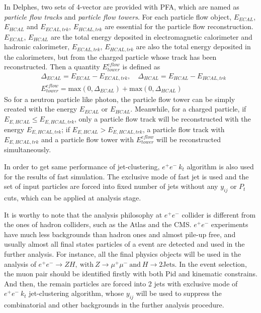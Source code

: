 \documentclass[a4paper,10pt,twoside]{cpc-hepnp}
\begin{document}
In Delphes, two sets of 4-vector are provided with PFA, which are named as {\it{particle flow tracks}} and {\it{particle flow towers}}. For each particle flow object, $E_{ECAL}$, $E_{HCAL}$ and $E_{ECAL, trk}$, $E_{HCAL, trk}$ are essential for the particle flow reconstruction. $E_{ECAL}$, $E_{HCAL}$ are the total energy deposited in electromagnetic calorimeter and hadronic calorimeter, $E_{ECAL, trk}$, $E_{HCAL, trk}$ are also the total energy deposited in the calorimeters, but from the charged particle whose track has been reconstructed. Then a quantity $E^{eflow}_{tower}$ is defined as
\begin{eqnarray}
&\Delta_{ECAL}=E_{ECAL}-E_{ECAL, trk}, \quad\Delta_{HCAL}=E_{HCAL}-E_{HCAL, trk}\\
&E^{eflow}_{tower}=\mathrm{max}(0,\Delta_{ECAL})+\mathrm{max}(0,\Delta_{HCAL})
\end{eqnarray}
So for a neutron particle like photon, the particle flow tower can be simply created with the energy $E_{ECAL}$ or $E_{HCAL}$. Meanwhile, for a charged particle,  if $E_{E,HCAL}\le E_{E,HCAL,trk}$, only a particle flow track will be reconstructed with the energy $E_{E,HCAL,trk}$; if $E_{E,HCAL}>E_{E,HCAL,trk}$, a particle flow track with $E_{E,HCAL,trk}$ and a particle flow tower with $E^{eflow}_{tower}$ will be reconstructed simultaneously.

In order to get same performance of jet-clustering, $e^+e^-~k_t$ algorithm is also used for the results of fast simulation. The exclusive mode of fast jet is used and  the set of  input particles are forced into fixed number of jets without any $y_{ij}$ or $P_t$ cuts, which can be applied at analysis stage.

It is worthy to note that the analysis philosophy at $e^+e^-$ collider is different from the ones  of hadron colliders, such as the Atlas and the CMS.  $e^+e^-$ experiments have much less backgrounds than hadron ones and almost pile-up free, and usually almost all final states particles of a event are detected and used in the further analysis.   For instance, all the final physics objects will be used in the analysis of $e^+e^- \to ZH,~\mbox{with}~Z \to\mu^+\mu^-~\mbox{and}~H \to 2\mbox{Jets} $. In the event selection, the muon pair should be identified firstly with both Pid and kinematic constrains. And then, the remain particles are forced into 2 jets with exclusive mode of $e^+e^-~k_t$ jet-clustering algorithm, whose $y_{ij}$ will be used to suppress the combinatorial and other backgrounds in the further analysis procedure.
\end{document}
